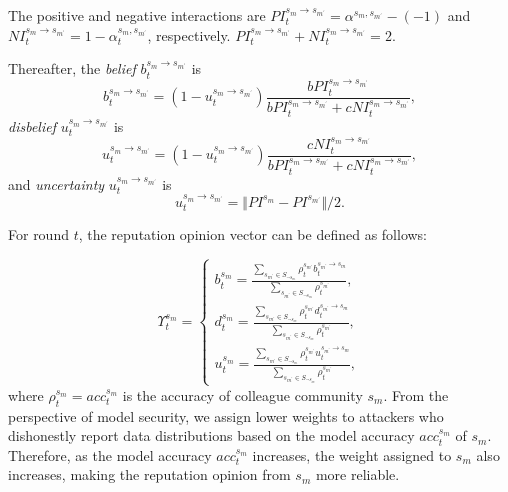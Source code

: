 \documentclass[lettersize,journal]{IEEEtran}
\begin{document}
The positive and negative interactions are $PI^{s_{m} \rightarrow s_{m^{\prime}}}_{t} = \alpha^{s_{m},s_{m^{\prime}}} -(-1)$ and $NI^{s_{m} \rightarrow s_{m^{\prime}}}_{t} = 1-\alpha^{s_{m},s_{m^{\prime}}}_{t}$, respectively. $PI^{s_{m} \rightarrow s_{m^{\prime}}}_{t} + NI^{s_{m} \rightarrow s_{m^{\prime}}}_{t} = 2$. 

Thereafter, the \textit{belief} $b^{s_{m} \rightarrow s_{m^{\prime}}}_{t}$ is $$b^{s_{m} \rightarrow s_{m^{\prime}}}_{t}=(1-u_t^{s_{m} \rightarrow s_{m^{\prime}}})\frac{bPI^{s_{m} \rightarrow s_{m^{\prime}}}_{t}}{ bPI^{s_{m} \rightarrow s_{m^{\prime}}}_{t}+cNI^{s_{m} \rightarrow s_{m^{\prime}}}_{t}},$$ 
\textit{disbelief} $u^{s_{m} \rightarrow s_{m^{\prime}}}_{t}$ is $$u^{s_{m} \rightarrow s_{m^{\prime}}}_{t}=(1-u^{s_{m} \rightarrow s_{m^{\prime}}}_{t})\frac{cNI^{s_{m} \rightarrow s_{m^{\prime}}}_{t}}{ bPI^{s_{m} \rightarrow s_{m^{\prime}}}_{t}+cNI^{s_{m} \rightarrow s_{m^{\prime}}}_{t}},$$ and \textit{uncertainty} $u^{s_{m} \rightarrow s_{m^{\prime}}}_{t}$ is $$u^{s_{m} \rightarrow s_{m^{\prime}}}_{t}=\Vert PI^{s_{m}}-PI^{s_{m^{\prime}}}\Vert/2.$$ 

For round $t$, the reputation opinion vector can be defined as follows:

\begin{equation}
\Upsilon^{s_m}_{t}=
\left  \{
      \begin{array}{ll}%
        b^{s_m}_{t}=\frac{\sum_{s_{m^{\prime}}\in S_{\neg s_m}}{\rho^{s_{m^{\prime}}}_{t}  b^{s_{m^{\prime}} \rightarrow s_m}_{t}}}{\sum_{s_{m^{\prime}}\in S_{\neg s_m}}{\rho^{s_{m^{\prime}}}_{t}}},\\
        d^{s_m}_{t}=\frac{\sum_{s_{m^{\prime}}\in S_{\neg s_m}}{\rho^{s_{m^{\prime}}}_{t}  d^{s_{m^{\prime}} \rightarrow s_m}_{t}}}{\sum_{s_{m^{\prime}}\in S_{\neg s_m}}{\rho^{s_{m^{\prime}}}_{t}}},\\
        u^{s_m}_{t}=\frac{\sum_{s_{m^{\prime}}\in S_{\neg s_m}}{\rho^{s_{m^{\prime}}}_{t}  u^{s_{m^{\prime}} \rightarrow s_m}_{t}}}{\sum_{s_{m^{\prime}}\in S_{\neg s_m}}{\rho^{s_{m^{\prime}}}_{t}}},                
    \end{array}
\right.
\end{equation}
where $\rho^{s_m}_{t}=acc^{s_m}_{t}$ is the accuracy of colleague community $s_m$. From the perspective of model security, we assign lower weights to attackers who dishonestly report data distributions based on the model accuracy $acc^{s_m}_{t}$ of $s_m$. Therefore, as the model accuracy $acc^{s_m}_{t}$ increases, the weight assigned to $s_m$ also increases, making the reputation opinion from $s_m$ more reliable.
\end{document}
